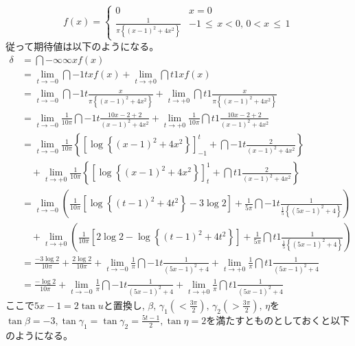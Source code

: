 \begin{enumerate}[(1)]
\begin{equation*}
        f(x) = 
        \begin{cases}
            0 & x = 0\\
            \frac{1}{\pi\left\{\left(x - 1\right)^2 + 4x^2\right\}} & -1\, \leq\, x < 0,\, 0 < x\, \leq\, 1 
        \end{cases}
    \end{equation*}
    従って期待値は以下のようになる。
    \begin{align*}
        \delta &= \dint{-\infty}{\infty}{xf(x)}\\
        &= \lim_{t \to -0}\dint{-1}{t}{xf(x)} + \lim_{t \to +0}\dint{t}{1}{xf(x)}\\
        &= \lim_{t \to -0}\dint{-1}{t}{\frac{x}{\pi\left\{(x - 1)^2 + 4x^2\right\}}}
         + \lim_{t \to +0}\dint{t}{1}{\frac{x}{\pi\left\{(x - 1)^2 + 4x^2\right\}}}\\
        &= \lim_{t \to -0}\frac{1}{10\pi}\dint{-1}{t}{\frac{10x - 2 + 2}{(x - 1)^2 + 4x^2}} 
         + \lim_{t \to +0}\frac{1}{10\pi}\dint{t}{1}{\frac{10x - 2 + 2}{(x - 1)^2 + 4x^2}}\\
        &= \lim_{t \to -0}\frac{1}{10\pi}\left\{\left[\log\left\{(x - 1)^2 + 4x^2\right\}\right]_{-1}^{t} + \dint{-1}{t}{\frac{2}{(x - 1)^2 + 4x^2}}\right\}\\
        &\quad + \lim_{t \to +0}\frac{1}{10\pi}\left\{\left[\log\left\{(x - 1)^2 + 4x^2\right\}\right]_{t}^{1} + \dint{t}{1}{\frac{2}{(x - 1)^2 + 4x^2}}\right\}\\
        &= \lim_{t \to -0}\left(\frac{1}{10\pi}\left[\log\left\{(t - 1)^2 + 4t^2\right\} - 3\log 2\right] + \frac{1}{5\pi}\dint{-1}{t}{\frac{1}{\frac{1}{5}\left\{(5x - 1)^2 + 4\right\}}}\right)\\
        &\quad + \lim_{t \to +0}\left(\frac{1}{10\pi}\left[2\log 2 - \log\left\{(t - 1)^2 + 4t^2\right\}\right] + \frac{1}{5\pi}\dint{t}{1}{\frac{1}{\frac{1}{5}\left\{(5x - 1)^2 + 4\right\}}}\right)\\
        &= \frac{-3\log 2}{10\pi} + \frac{2\log 2}{10\pi} + \lim_{t \to -0}\frac{1}{\pi}\dint{-1}{t}{\frac{1}{(5x - 1)^2 + 4}} + \lim_{t \to +0}\frac{1}{\pi}\dint{t}{1}{\frac{1}{(5x - 1)^2 + 4}}\\
        &= \frac{-\log 2}{10\pi} + \lim_{t \to -0}\frac{1}{\pi}\dint{-1}{t}{\frac{1}{(5x - 1)^2 + 4}} + \lim_{t \to +0}\frac{1}{\pi}\dint{t}{1}{\frac{1}{(5x - 1)^2 + 4}}
    \end{align*}
    ここで$5x - 1 = 2\tan u$と置換し, $\beta,\, \gamma_1(< \frac{3\pi}{2}),\, \gamma_2(> \frac{3\pi}{2}),\, \eta$を$\tan\beta = -3, \tan\gamma_1 = \tan\gamma_2 = \frac{5t - 1}{2}, \tan\eta = 2$を満たすとものとしておくと以下のようになる。

\end{enumerate}
